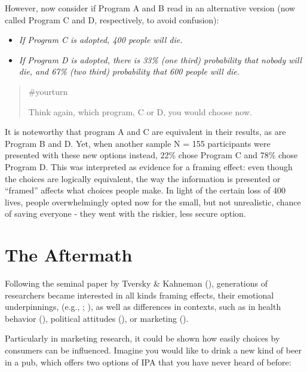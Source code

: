 \documentclass[
  letterpaper,
]{book}
\providecommand{\tightlist}{%
  \setlength{\itemsep}{0pt}\setlength{\parskip}{0pt}}\usepackage{longtable,booktabs,array}
\begin{document}
However, now consider if Program A and B read in an alternative version
(now called Program C and D, respectively, to avoid confusion):

\begin{itemize}
\tightlist
\item
  \emph{If Program C is adopted, 400 people will die.}
\item
  \emph{If Program D is adopted, there is 33\% (one third) probability
  that nobody will die, and 67\% (two third) probability that 600 people
  will die.}
\end{itemize}

\begin{quote}
{\#yourturn}

Think again, which program, C or D, you would choose now.
\end{quote}

It is noteworthy that program A and C are equivalent in their results,
as are Program B and D. Yet, when another sample N = 155 participants
were presented with these new options instead, 22\% chose Program C and
78\% chose Program D. This was interpreted as evidence for a framing
effect: even though the choices are logically equivalent, the way the
information is presented or ``framed'' affects what choices people make.
In light of the certain loss of 400 lives, people overwhelmingly opted
now for the small, but not unrealistic, chance of saving everyone - they
went with the riskier, less secure option.

\section{The Aftermath}\label{the-aftermath-3}

Following the seminal paper by Tversky \& Kahneman
(), generations of researchers
became interested in all kinds framing effects, their emotional
underpinnings, (e.g., ;
), as well as
differences in contexts, such as in health behavior
(),
political attitudes (), or marketing ().

Particularly in marketing research, it could be shown how easily choices
by consumers can be influenced. Imagine you would like to drink a new
kind of beer in a pub, which offers two options of IPA that you have
never heard of before:
\end{document}
